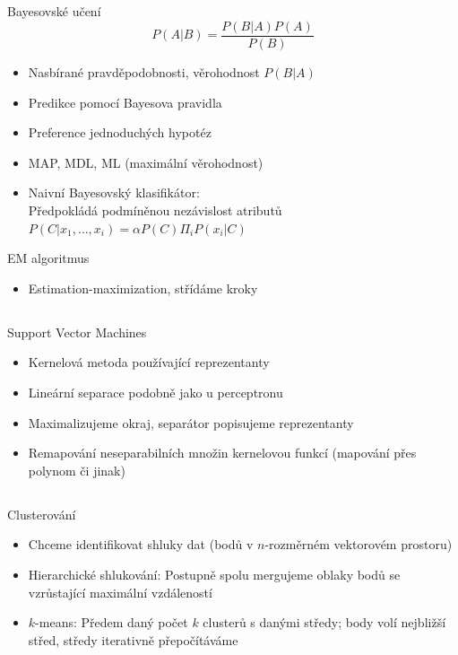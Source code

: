 \documentclass{beamer}
\begin{document}
\subsection{}
\begin{frame}{Bayesovské učení}
$$ P(A|B) = \frac{P(B|A)P(A)}{P(B)} $$
\begin{itemize}
\item Nasbírané pravděpodobnosti, věrohodnost $P(B|A)$
\item Predikce pomocí Bayesova pravidla
\item Preference jednoduchých hypotéz
\item MAP, MDL, ML (maximální věrohodnost)
\item Naivní Bayesovský klasifikátor: \\
	Předpokládá podmíněnou nezávislost atributů
	$P(C|x_1,\dots,x_i) = \alpha P(C) \Pi_i P(x_i|C)$
\end{itemize}

\begin{block}{EM algoritmus}
\begin{itemize}
\item Estimation-maximization, střídáme kroky
\end{itemize}
\end{block}
\end{frame}

\subsection{}
\begin{frame}{Support Vector Machines}
\begin{itemize}
\item Kernelová metoda používající reprezentanty
\item Lineární separace podobně jako u perceptronu
\item Maximalizujeme okraj, separátor popisujeme reprezentanty
\item Remapování neseparabilních množin kernelovou funkcí (mapování přes polynom či jinak)
\end{itemize}
\end{frame}

\subsection{}
\begin{frame}{Clusterování}
\begin{itemize}
\item Chceme identifikovat shluky dat (bodů v $n$-rozměrném vektorovém prostoru)
\item Hierarchické shlukování: Postupně spolu mergujeme oblaky bodů se vzrůstající maximální vzdáleností
\item $k$-means: Předem daný počet $k$ clusterů s danými středy; body volí nejbližší střed, středy iterativně přepočítáváme
\end{itemize}
\end{frame}
\end{document}
